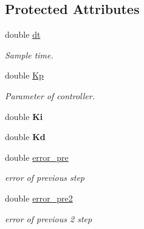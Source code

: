 \subsection*{Protected Attributes}
\begin{DoxyCompactItemize}
\item 
\mbox{\label{class_controller_a61c85fc851f12adecabcd34fc8bc6942}} 
double \mbox{\hyperlink{class_controller_a61c85fc851f12adecabcd34fc8bc6942}{dt}}
\begin{DoxyCompactList}\small\item\em Sample time. \end{DoxyCompactList}\item 
\mbox{\label{class_controller_a8598198ef69da91488d4f1290cd180ae}} 
double \mbox{\hyperlink{class_controller_a8598198ef69da91488d4f1290cd180ae}{Kp}}
\begin{DoxyCompactList}\small\item\em Parameter of controller. \end{DoxyCompactList}\item 
\mbox{\label{class_controller_aefb3b5df3639816d387b669f0e3447fd}} 
double {\bfseries Ki}
\item 
\mbox{\label{class_controller_ae0dfb120a314c8d07b7bf2b0202edea6}} 
double {\bfseries Kd}
\item 
\mbox{\label{class_controller_a621f7c9f545ea73b00c4a8a1edbfa212}} 
double \mbox{\hyperlink{class_controller_a621f7c9f545ea73b00c4a8a1edbfa212}{error\+\_\+pre}}
\begin{DoxyCompactList}\small\item\em error of previous step \end{DoxyCompactList}\item 
\mbox{\label{class_controller_aa2de3a56462e86a7390324c04d31c6c5}} 
double \mbox{\hyperlink{class_controller_aa2de3a56462e86a7390324c04d31c6c5}{error\+\_\+pre2}}
\begin{DoxyCompactList}\small\item\em error of previous 2 step \end{DoxyCompactList}\item 
\mbox{\label{class_controller_ad3426386f22bdf2e1781a27cfd87d1f8}} 

\end{DoxyCompactItemize}
